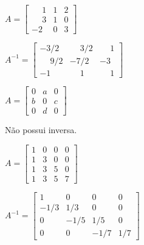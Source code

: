 \documentclass[12pt]{exam}
\begin{document}
\begin{exercicio}
      $
    A =\begin{bmatrix}
        \phantom{-} 1 & 1 & 2\\
        \phantom{-} 3 & 1 & 0\\
        -2 & 0 & 3
    \end{bmatrix}
    $
    \begin{solucao}
        $
        A^{-1} =\begin{bmatrix}
            -3/2 & \phantom{-} 3/2 & \phantom{-} 1\\
            \phantom{-} 9/2 & -7/2 & -3\\
            -1 & \phantom{-} 1 & \phantom{-} 1
        \end{bmatrix}
        $
    \end{solucao}
\end{exercicio}

\begin{exercicio}
    $
    A = \begin{bmatrix}
        0 & a & 0\\
        b & 0 & c\\
        0 & d & 0
    \end{bmatrix}
    $
    \begin{solucao}
       Não possui inversa.
    \end{solucao}
\end{exercicio}

\begin{exercicio}
    $
        A = \begin{bmatrix}
            1 & 0 & 0 & 0\\
            1 & 3 & 0 & 0\\
            1 & 3 & 5 & 0\\
            1 & 3 & 5 & 7
        \end{bmatrix}
    $
    \begin{solucao}
        $
            A^{-1} = \begin{bmatrix}
                1 & 0 & 0 & 0\\
                -1/3 & 1/3 & 0 & 0\\
                0 & -1/5 & 1/5 & 0\\
                0 & 0 & -1/7 & 1/7
            \end{bmatrix}
        $
    \end{solucao}
\end{exercicio}
\end{document}
